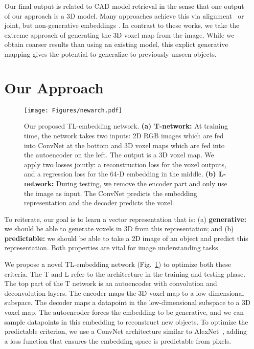 \documentclass[runningheads]{llncs}
\begin{document}
Our final output is related to CAD model retrieval in the sense
that one output of our approach is a 3D model. Many approaches
achieve this via alignment~\cite{Lim13,Aubry14,Huang15} or
joint, but non-generative embeddings \cite{Li15}.
In contrast
to these works, we take the extreme approach of generating the
3D voxel map from the image. While we obtain coarser
results than using an existing model, this explict generative mapping gives
the potential to generalize to previously unseen objects.


\section{Our Approach}\begin{figure}[t]
\centering
\texttt{[image: Figures/newarch.pdf]}
\caption{Our proposed TL-embedding network. 
{\bf (a) T-network:} At training time, the network takes two inputs:
2D RGB images which are fed into ConvNet at the bottom and 3D voxel maps
which are fed into the autoencoder on the left. The output is a 3D voxel
map.  We apply two losses jointly: a reconstruction loss for the voxel
outputs, and a regression loss for the 64-D embedding in the middle. 
{\bf (b) L-network:} During testing, we remove the encoder part and
only use the image as input. The ConvNet predicts the embedding
representation and the decoder predicts the voxel.}
\label{fig:nwarch}
\end{figure}

To reiterate, our goal is to 
learn a vector representation that is:
(a) {\bf generative:} we should be able to generate voxels in 3D from 
this representation; and
(b) {\bf predictable:} we should be able to take a 2D image of an object
and predict this representation. Both properties are vital for image
understanding tasks.

We propose a novel TL-embedding network (Fig.~\ref{fig:nwarch}) 
to optimize both these criteria. The T and L refer to the architecture
in the training and testing phase. The top part of the T network is an
autoencoder with convolution and deconvolution layers. The encoder maps 
the 3D voxel map to a low-dimensional subspace. The decoder maps a
datapoint in the low-dimensional subspace to a 3D voxel map. The 
autoencoder forces the embedding to be generative, and we can
sample datapoints in this embedding to reconstruct new objects.
To optimize the predictable criterion, we use a ConvNet
architecture similar to AlexNet~\cite{AlexNet}, adding a
loss function that ensures the embedding space is predictable
from pixels.
\end{document}
